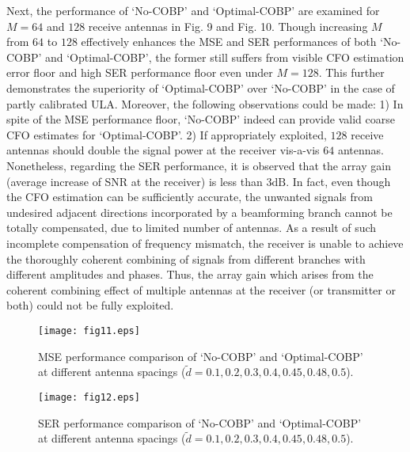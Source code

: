 \documentclass[12pt, draftclsnofoot, onecolumn]{IEEEtran}
\begin{document}
Next, the performance of `No-COBP' and `Optimal-COBP' are examined for $M\!=\!64$ and $128$ receive antennas in Fig. 9 and Fig. 10.
Though increasing $M$ from $64$ to $128$ effectively enhances the MSE and SER performances of both `No-COBP' and `Optimal-COBP', the former still suffers from visible CFO estimation error floor and high SER performance floor even under $M\!=\!128$. This further demonstrates the superiority of `Optimal-COBP' over `No-COBP' in the case of partly calibrated ULA.
Moreover, the following observations could be made: 1) In spite of the MSE performance floor, `No-COBP' indeed can provide valid coarse CFO estimates for `Optimal-COBP'.
2) If appropriately exploited, $128$ receive antennas should double the signal power at the receiver vis-a-vis $64$ antennas. Nonetheless, regarding the SER performance, it is observed that the array gain~\cite{A_Paulraj2003} (average increase of SNR at the receiver) is less than $3 \text{dB}$. In fact, even though the CFO estimation can be sufficiently accurate, the unwanted signals from undesired adjacent directions incorporated by a beamforming branch cannot be totally compensated, due to limited number of antennas. As a result of such incomplete compensation of frequency mismatch, the receiver is unable to achieve the thoroughly coherent combining of signals from different branches with different amplitudes and phases. Thus, the array gain which arises from the coherent combining effect of multiple antennas at the receiver (or transmitter or both) could not be fully exploited.

\begin{figure}[htbp]
\vspace{-1.5em}
\setlength{\abovecaptionskip}{-0.1cm}
\setlength{\belowcaptionskip}{0.5cm}
  \centering
  \begin{minipage}{80mm}
  \centering
    \texttt{[image: fig11.eps]}
    \caption{ MSE performance comparison of `No-COBP' and `Optimal-COBP' at different antenna spacings ($\tilde{d} = 0.1, 0.2, 0.3, 0.4, 0.45, 0.48, 0.5$). }
  \end{minipage}
  \begin{minipage}{80mm}
  \centering
    \texttt{[image: fig12.eps]}
    \caption{ SER performance comparison of `No-COBP' and `Optimal-COBP' at different antenna spacings ($\tilde{d} = 0.1, 0.2, 0.3, 0.4, 0.45, 0.48, 0.5$). }
  \end{minipage}
\end{figure}
\end{document}
